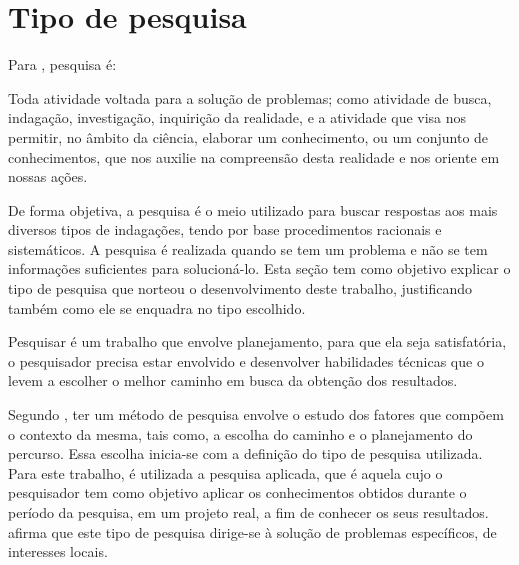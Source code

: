 \section{Tipo de pesquisa}

\par Para , pesquisa é:

\begin{citacao}
	Toda atividade voltada para a solução de problemas; como atividade de busca, indagação, investigação, inquirição da realidade, e a atividade que visa nos permitir, no âmbito da ciência, elaborar um  conhecimento, ou um conjunto de conhecimentos, que nos auxilie na compreensão desta realidade e nos oriente em nossas ações.
\end{citacao}


\par De forma objetiva, a pesquisa é o meio utilizado para buscar respostas aos mais diversos tipos de indagações, tendo por base procedimentos racionais e sistemáticos. A pesquisa é realizada quando se tem um problema e não se tem informações suficientes para solucioná-lo. Esta seção tem como objetivo explicar o tipo de pesquisa que norteou o desenvolvimento deste trabalho, justificando também como ele se enquadra no tipo escolhido.

\par Pesquisar é um trabalho que envolve planejamento, para que ela seja satisfatória, o pesquisador precisa estar envolvido e  desenvolver habilidades técnicas que o levem a escolher o melhor caminho em busca da obtenção dos resultados.

\par Segundo , ter um método de pesquisa envolve o estudo dos fatores que compõem o contexto da mesma, tais como, a escolha do caminho e o planejamento do percurso. Essa escolha inicia-se com a definição do tipo de pesquisa utilizada. Para este trabalho, é utilizada a pesquisa aplicada, que é aquela cujo o pesquisador tem como objetivo aplicar os conhecimentos obtidos durante o período da pesquisa, em um projeto real, a fim de conhecer os seus resultados.  afirma que este tipo de pesquisa dirige-se à solução de problemas específicos, de interesses locais.

